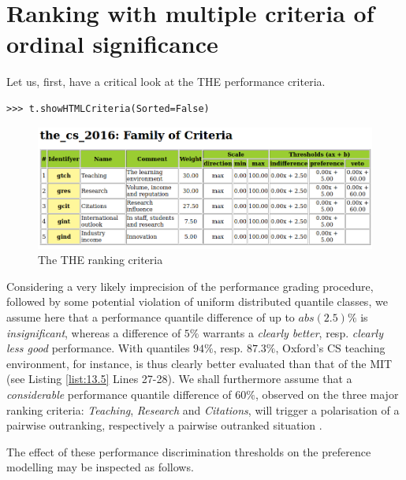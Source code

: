 \section{Ranking with multiple criteria of ordinal significance}
\label{sec:13.2}

Let us, first, have a critical look at the THE performance criteria.

\begin{lstlisting}
>>> t.showHTMLCriteria(Sorted=False)
\end{lstlisting}

\begin{figure}[h]
\includegraphics[width=12cm]{Figures/the_cs_2016Criteria.png}
\caption{The THE ranking criteria}
\label{fig:13.1}       %
\end{figure}

Considering a very likely imprecision of the performance grading procedure, followed by some potential violation of uniform distributed quantile classes, we assume here that a performance quantile difference of up to $abs(2.5)\%$ is \emph{insignificant}, whereas a difference of $5\%$ warrants a \emph{clearly better}, resp. \emph{clearly less good} performance. With quantiles $94\%$, resp. $87.3\%$, Oxford's CS teaching environment, for instance, is thus clearly better evaluated than that of the MIT (see Listing \ref{list:13.5} Lines 27-28). We shall furthermore assume that a \emph{considerable} performance quantile difference of $60\%$, observed on the three major ranking criteria: \emph{Teaching}, \emph{Research} and \emph{Citations}, will trigger a polarisation of a pairwise outranking, respectively a pairwise outranked situation \citep{BIS-2013}.

The effect of these performance discrimination thresholds on the preference modelling may be inspected as follows.

